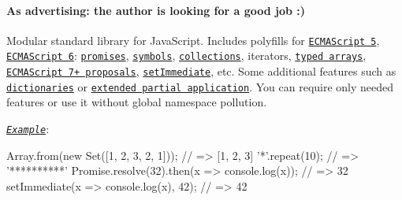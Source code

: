\href{https://gitter.im/zloirock/core-js?utm_source=badge&utm_medium=badge&utm_campaign=pr-badge&utm_content=badge}{\tt } \href{https://www.npmjs.com/package/core-js}{\tt } \href{http://npm-stat.com/charts.html?package=core-js&author=&from=2014-11-18}{\tt } \href{https://travis-ci.org/zloirock/core-js}{\tt } \href{https://david-dm.org/zloirock/core-js?type=dev}{\tt } \paragraph*{As advertising\+: the author is looking for a good job \+:)}

Modular standard library for Java\+Script. Includes polyfills for \href{#ecmascript-5}{\tt E\+C\+M\+A\+Script 5}, \href{#ecmascript-6}{\tt E\+C\+M\+A\+Script 6}\+: \href{#ecmascript-6-promise}{\tt promises}, \href{#ecmascript-6-symbol}{\tt symbols}, \href{#ecmascript-6-collections}{\tt collections}, iterators, \href{#ecmascript-6-typed-arrays}{\tt typed arrays}, \href{#ecmascript-7-proposals}{\tt E\+C\+M\+A\+Script 7+ proposals}, \href{#setimmediate}{\tt set\+Immediate}, etc. Some additional features such as \href{#dict}{\tt dictionaries} or \href{#partial-application}{\tt extended partial application}. You can require only needed features or use it without global namespace pollution.

\href{http://goo.gl/a2xexl}{\tt {\itshape Example}}\+: 
\begin{DoxyCode}
Array.from(new Set([1, 2, 3, 2, 1]));          // => [1, 2, 3]
'*'.repeat(10);                                // => '**********'
Promise.resolve(32).then(x => console.log(x)); // => 32
setImmediate(x => console.log(x), 42);         // => 42
\end{DoxyCode}


